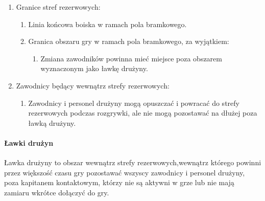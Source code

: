 \documentclass[12pt]{article}
\begin{document}
\begin{enumerate}
\item Granice stref rezerwowych:
  \begin{enumerate}
  \item Linia końcowa boiska w ramach pola bramkowego.

  \item Granica obszaru gry w ramach pola bramkowego, za wyjątkiem:
    \begin{enumerate}
    \item Zmiana zawodników powinna mieć miejsce poza obszarem wyznaczonym jako
    ławkę drużyny.
    \end{enumerate}
  \end{enumerate}

\item Zawodnicy będący wewnątrz strefy rezerwowych:
  \begin{enumerate}
  \item Zawodnicy i personel drużyny mogą opuszczać i powracać do strefy
  rezerwowych podczas rozgrywki, ale nie mogą pozostawać na dłużej poza
  ławką drużyny.
  \end{enumerate}
\end{enumerate}

\paragraph{Ławki drużyn}
Ławka drużyny to obszar wewnątrz strefy
rezerwowych,wewnątrz którego powinni przez większość czasu gry
pozostawać wszyscy zawodnicy i personel drużyny, poza kapitanem
kontaktowym, którzy nie są aktywni w grze lub nie mają zamiaru wkrótce
dołączyć do gry.
\end{document}
